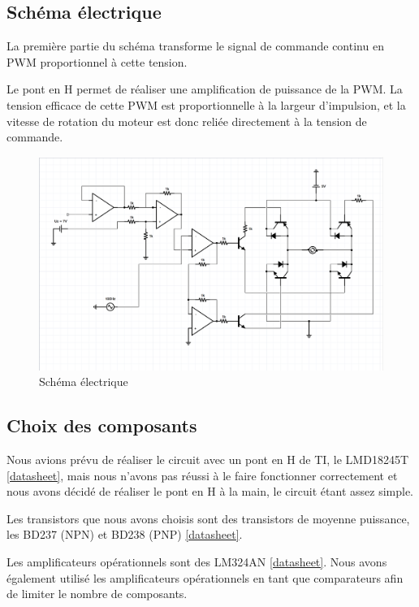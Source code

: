 \documentclass[a4paper]{article}
\begin{document}
\subsection{Schéma électrique}

La première partie du schéma transforme le signal de commande continu en PWM proportionnel à cette tension.

Le pont en H permet de réaliser une amplification de puissance de la PWM. La tension efficace de cette PWM est proportionnelle à la largeur d'impulsion, et la vitesse de rotation du moteur est donc reliée directement à la tension de commande.

\begin{figure}[H]
\centering
	\includegraphics[width=1\textwidth]{schema}
	\caption{Schéma électrique}
\end{figure}


\subsection{Choix des composants}

Nous avions prévu de réaliser le circuit avec un pont en H de TI, le LMD18245T \href{http://www.ti.com/lit/ds/symlink/lmd18245.pdf}{[datasheet]}, mais nous n'avons pas réussi à le faire fonctionner correctement et nous avons décidé de réaliser le pont en H à la main, le circuit étant assez simple.

Les transistors que nous avons choisis sont des transistors de moyenne puissance, les BD237 (NPN) et BD238 (PNP) \href{http://www.onsemi.com/pub_link/Collateral/BD237-D.PDF}{[datasheet]}.

Les amplificateurs opérationnels sont des LM324AN \href{https://www.fairchildsemi.com/datasheets/LM/LM324.pdf}{[datasheet]}. Nous avons également utilisé les amplificateurs opérationnels en tant que comparateurs afin de limiter le nombre de composants.
\end{document}
